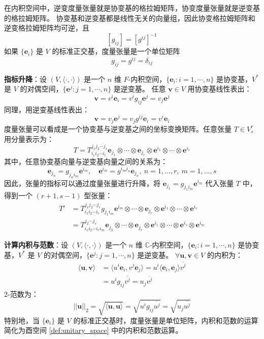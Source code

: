 \begin{note}
    在内积空间中，逆变度量张量就是协变基的格拉姆矩阵，协变度量张量就是逆变基的格拉姆矩阵。
    协变基和逆变基都是线性无关的向量组，因此协变格拉姆矩阵和逆变格拉姆矩阵均可逆，且
    \[
        [g_{ij}] = [g^{ij}]^{-1}
    \]
    如果 $\{\mathbf{e}_i\}$ 是 $V$ 的标准正交基，度量张量是一个单位矩阵
    \[
        g_{ij} = g^{ij} = \delta_{ij}
    \]
\end{note}


\vspace{1em}
\textbf{指标升降}：设 $(V,\langle \cdot,\cdot\rangle)$ 是一个 $n$ 维 $F$-内积空间，$\{\mathbf{e}_i:i=1,\cdots,n\}$ 是协变基，$V^*$ 是 $V$ 的对偶空间，$\{\mathbf{e}^j:j=1,\cdots,n\}$ 是逆变基。
任意 $\mathbf{v}\in V$ 用协变基线性表出：
\[
    \mathbf{v} = v^i\mathbf{e}_i = v^i g_{ij} \mathbf{e}^j = v_j \mathbf{e}^j
\]
同理，用逆变基线性表出：
\[
    \mathbf{v} = v_j \mathbf{e}^j = v_j g^{ij} \mathbf{e}_i = v^i \mathbf{e}_i
\]
度量张量可以看成是一个协变基与逆变基之间的坐标变换矩阵。任意张量 $T\in V^r_s$ 用分量表示为：
\[
    T = T_{i_1 i_2 \cdots i_r}^{j_1 j_2 \cdots j_s} 
    \mathbf{e}_{j_1} \otimes \cdots \otimes \mathbf{e}_{j_r} \otimes \mathbf{e}^{i_1} \otimes \cdots \otimes \mathbf{e}^{i_s}
\]
其中，任意协变基向量与逆变基向量之间的关系为：
\[
    \mathbf{e}_{j_n} = g_{j_n i_m} \mathbf{e}^{i_m},\quad \mathbf{e}^{i_m} = g^{i_m j_n} \mathbf{e}_{j_n},\ n=1,\ldots,r,\ m=1,\ldots,s
\]
因此，张量的指标可以通过度量张量进行升降，将 $\mathbf{e}_{j_1} = g_{j_1 i_m} \mathbf{e}^{i_m}$ 代入张量 $T$ 中，得到一个 $(r+1,s-1)$ 型张量：
\begin{align*}
    T' &= T_{i_1 i_2 \cdots i_r}^{j_1 j_2 \cdots j_s} 
    g_{j_1 i_m} \mathbf{e}^{i_m} \otimes \cdots \otimes \mathbf{e}_{j_r} \otimes \mathbf{e}^{i_1} \otimes \cdots \otimes \mathbf{e}^{i_s}\\
    &= T_{i_1 i_2 \cdots i_r i_m}^{j_2 \cdots j_s} \mathbf{e}_{j_2} \otimes \cdots \otimes \mathbf{e}_{j_r} \otimes \mathbf{e}^{i_1} \otimes \cdots \otimes \mathbf{e}^{i_s} \otimes \mathbf{e}^{i_m}
\end{align*}

\vspace{1em}

\textbf{计算内积与范数}：设 $(V,\langle \cdot,\cdot\rangle)$ 是一个 $n$ 维 $\mathbb{C}$-内积空间，$\{\mathbf{e}_i:i=1,\cdots,n\}$ 是协变基，$V^*$ 是 $V$ 的对偶空间，$\{\mathbf{e}^j:j=1,\cdots,n\}$ 是逆变基。
$\forall \mathbf{u},\mathbf{v}\in V$ 的内积为：
\begin{align*}
    \langle \mathbf{u},\mathbf{v} \rangle &= \langle u^i \mathbf{e}_i, v^j \mathbf{e}_j \rangle = u^i \langle \mathbf{e}_i, \mathbf{e}_j \rangle \overline{v^j} \\
    & = u^i  g_{ij} \overline{v^j} = u_j \overline{v^j} 
\end{align*}
2-范数为：
\[
    ||\mathbf{u}||_2 = \sqrt{\langle \mathbf{u},\mathbf{u} \rangle} =  \sqrt{u^i  g_{ij} \overline{u^j}} = \sqrt{u_j \overline{u^j}} 
\]
特别地，当 $\{\mathbf{e}_i\}$ 是 $V$ 的标准正交基时，度量张量是单位矩阵，内积和范数的运算简化为酉空间 \ref{def:unitary_space} 中的内积和范数运算。

